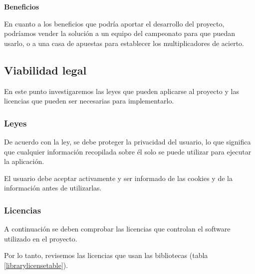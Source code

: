 \textbf{Beneficios}

En cuanto a los beneficios que podría aportar el desarrollo del proyecto, podríamos vender la solución a un equipo del campeonato para que puedan usarlo, o a una casa de apuestas para establecer los multiplicadores de acierto.

\subsection{Viabilidad legal}

En este punto investigaremos las leyes que pueden aplicarse al proyecto y las licencias que pueden ser necesarias para implementarlo.

\subsubsection{Leyes}

De acuerdo con la ley, se debe proteger la privacidad del usuario, lo que significa que cualquier información recopilada sobre él solo se puede utilizar para ejecutar la aplicación.

El usuario debe aceptar activamente y ser informado de las cookies y de la información antes de utilizarlas.

\subsubsection{Licencias}

A continuación se deben comprobar las licencias que controlan el software utilizado en el proyecto.

Por lo tanto, revisemos las licencias que usan las bibliotecas  (tabla \ref{librarylicensetable}).


